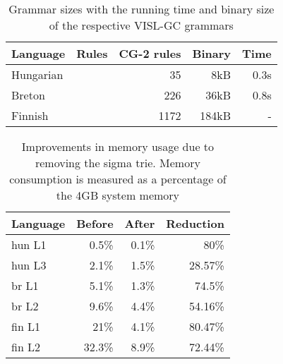 \documentclass{article}
\begin{document}

\begin{table*}[h]
  \centering
  \caption{Grammar sizes with the running time and binary size of the respective
           VISL-GC grammars}
  \label{tab:grammar_size}
  \begin{tabular}{ | l | r | r | r | r | }
  \hline
  \textbf{Language} & \textbf{Rules} & \textbf{CG-2 rules} &
  \textbf{Binary} & \textbf{Time} \\
  \hline
  Hungarian & &   35 &   8kB & 0.3s \\
  Breton    & &  226 &  36kB & 0.8s \\
  Finnish   & & 1172 & 184kB & - \\    %
  \hline
  \end{tabular}
\end{table*}

\begin{table}[h]
  \centering
  \caption{Improvements in memory usage due to removing the sigma trie. Memory
           consumption is measured as a percentage of the 4GB system memory}
  \label{tab:sigma_memory}
  \begin{tabular}{ | l | r | r | r | }
  \hline
  \textbf{Language} & \textbf{Before} & \textbf{After} & \textbf{Reduction} \\
  \hline
  hun L1 & 0.5\% & 0.1\% & 80\% \\
  hun L3 & 2.1\% & 1.5\% & 28.57\% \\
  br L1 & 5.1\% & 1.3\% & 74.5\% \\
  br L2 & 9.6\% & 4.4\% & 54.16\% \\
  fin L1 & 21\% & 4.1\% & 80.47\% \\
  fin L2 & 32.3\% & 8.9\% & 72.44\% \\
  \hline
  \end{tabular}
\end{table}
\end{document}
